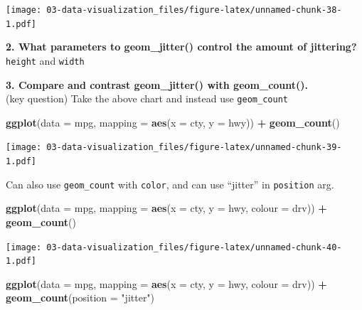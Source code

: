 \documentclass[]{book}
\newenvironment{Shaded}{\begin{snugshade}}{\end{snugshade}}
\newcommand{\DataTypeTok}[1]{\textcolor[rgb]{0.13,0.29,0.53}{#1}}
\newcommand{\KeywordTok}[1]{\textcolor[rgb]{0.13,0.29,0.53}{\textbf{#1}}}
\newcommand{\NormalTok}[1]{#1}
\newcommand{\OperatorTok}[1]{\textcolor[rgb]{0.81,0.36,0.00}{\textbf{#1}}}
\newcommand{\StringTok}[1]{\textcolor[rgb]{0.31,0.60,0.02}{#1}}
\theoremstyle{definition}
\theoremstyle{definition}
\theoremstyle{definition}
\theoremstyle{remark}
\begin{document}
\texttt{[image: 03-data-visualization\_files/figure-latex/unnamed-chunk-38-1.pdf]}

\textbf{2. What parameters to geom\_jitter() control the amount of
jittering?}\\
\texttt{height} and \texttt{width}

\textbf{3. Compare and contrast geom\_jitter() with geom\_count().}\\
(key question) Take the above chart and instead use \texttt{geom\_count}

\begin{Shaded}
\begin{Highlighting}[]
\KeywordTok{ggplot}\NormalTok{(}\DataTypeTok{data =}\NormalTok{ mpg, }\DataTypeTok{mapping =} \KeywordTok{aes}\NormalTok{(}\DataTypeTok{x =}\NormalTok{ cty, }\DataTypeTok{y =}\NormalTok{ hwy)) }\OperatorTok{+}\StringTok{ }
\StringTok{  }\KeywordTok{geom_count}\NormalTok{()}
\end{Highlighting}
\end{Shaded}

\texttt{[image: 03-data-visualization\_files/figure-latex/unnamed-chunk-39-1.pdf]}

Can also use \texttt{geom\_count} with \texttt{color}, and can use
``jitter'' in \texttt{position} arg.

\begin{Shaded}
\begin{Highlighting}[]
\KeywordTok{ggplot}\NormalTok{(}\DataTypeTok{data =}\NormalTok{ mpg, }\DataTypeTok{mapping =} \KeywordTok{aes}\NormalTok{(}\DataTypeTok{x =}\NormalTok{ cty, }\DataTypeTok{y =}\NormalTok{ hwy, }\DataTypeTok{colour =}\NormalTok{ drv)) }\OperatorTok{+}\StringTok{ }
\StringTok{  }\KeywordTok{geom_count}\NormalTok{()}
\end{Highlighting}
\end{Shaded}

\texttt{[image: 03-data-visualization\_files/figure-latex/unnamed-chunk-40-1.pdf]}

\begin{Shaded}
\begin{Highlighting}[]
\KeywordTok{ggplot}\NormalTok{(}\DataTypeTok{data =}\NormalTok{ mpg, }\DataTypeTok{mapping =} \KeywordTok{aes}\NormalTok{(}\DataTypeTok{x =}\NormalTok{ cty, }\DataTypeTok{y =}\NormalTok{ hwy, }\DataTypeTok{colour =}\NormalTok{ drv)) }\OperatorTok{+}\StringTok{ }
\StringTok{  }\KeywordTok{geom_count}\NormalTok{(}\DataTypeTok{position =} \StringTok{"jitter"}\NormalTok{)}
\end{Highlighting}
\end{Shaded}
\end{document}
